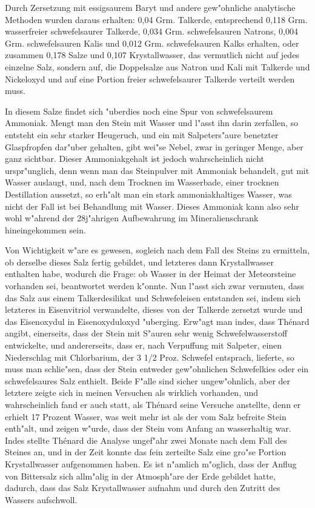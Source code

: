\documentclass[a4paper, 11pt, oneside]{article}
\begin{document}
Durch Zersetzung mit essigsaurem Baryt und andere gew"ohnliche analytische Methoden wurden daraus erhalten: 0,04 Grm. Talkerde, entsprechend 0,118 Grm. wasserfreier schwefelsaurer Talkerde, 0,034 Grm. schwefelsauren Natrons, 0,004 Grm. schwefelsauren Kalis und 0,012 Grm. schwefelsauren Kalks erhalten, oder zusammen 0,178 Salze und 0,107 Krystallwasser, das vermutlich nicht auf jedes einzelne Salz, sondern auf, die Doppelsalze aus Natron und Kali mit Talkerde und Nickeloxyd und auf eine Portion freier schwefelsaurer Talkerde verteilt werden muss.

In diesem Salze findet sich "uberdies noch eine Spur von schwefelsaurem Ammoniak. Mengt man den Stein mit Wasser und l"asst ihn darin zerfallen, so entsteht ein sehr starker Heugeruch, und ein mit Salpeters"aure benetzter Glaspfropfen dar"uber gehalten, gibt wei"se Nebel, zwar in geringer Menge, aber ganz sichtbar. Dieser Ammoniakgehalt ist jedoch wahrscheinlich nicht urspr"unglich, denn wenn man das Steinpulver mit Ammoniak behandelt, gut mit Wasser auslaugt, und, nach dem Trocknen im Wasserbade, einer trocknen Destillation aussetzt, so erh"alt man ein stark ammoniakhaltiges Wasser, was nicht der Fall ist bei Behandlung mit Wasser. Dieses Ammoniak kann also sehr wohl w"ahrend der 28j"ahrigen Aufbewahrung im Mineralienschrank hineingekommen sein.

Von Wichtigkeit w"are es gewesen, sogleich nach dem Fall des Steins zu ermitteln, ob derselbe dieses Salz fertig gebildet, und letzteres dann Krystallwasser enthalten habe, wodurch die Frage: ob Wasser in der Heimat der Meteorsteine vorhanden sei, beantwortet werden k"onnte. Nun l"asst sich zwar vermuten, dass das Salz aus einem Talkerdesilikat und Schwefeleisen entstanden sei, indem sich letzteres in Eisenvitriol verwandelte, dieses von der Talkerde zersetzt wurde und das Eisenoxydul in Eisenoxyduloxyd "uberging. Erw"agt man indes, dass Thénard angibt, einerseits, dass der Stein mit S"auren sehr wenig Schwefelwasserstoff entwickelte, und andererseits, dass er, nach Verpuffung mit Salpeter, einen Niederschlag mit Chlorbarium, der 3 1/2 Proz. Schwefel entsprach, lieferte, so muss man schlie"sen, dass der Stein entweder gew"ohnlichen Schwefelkies oder ein schwefelsaures Salz enthielt. Beide F"alle sind sicher ungew"ohnlich, aber der letztere zeigte sich in meinen Versuchen als wirklich vorhanden, und wahrscheinlich fand er auch statt, als Thénard seine Versuche anstellte, denn er erhielt 17 Prozent Wasser, was weit mehr ist als der vom Salz befreite Stein enth"alt, und zeigen w"urde, dass der Stein vom Anfang an wasserhaltig war. Indes stellte Thénard die Analyse ungef"ahr zwei Monate nach dem Fall des Steines an, und in der Zeit konnte das fein zerteilte Salz eine gro"se Portion Krystallwasser aufgenommen haben. Es ist n"amlich m"oglich, dass der Anflug von Bittersalz sich allm"alig in der Atmosph"are der Erde gebildet hatte, dadurch, dass das Salz Krystallwasser aufnahm und durch den Zutritt des Wassers aufschwoll.
\end{document}
